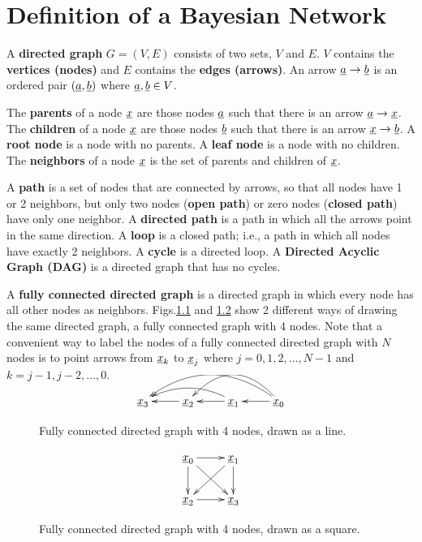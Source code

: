 \chapter{Definition of a Bayesian Network}

\label{ch-bnet-def}

A {\bf directed graph} $G=(V,E)$
consists of two sets, $V$
and $E$. $V$ contains
the {\bf vertices (nodes)}
and $E$ contains the {\bf edges (arrows)}.
An arrow $\rva\rarrow \rvb$ is an
ordered pair
$(\rva,\rvb)$ where $\rva, \rvb\in V$.

The {\bf parents}
of a node $\rvx$ are
those nodes $\rva$
such that there is an arrow
$\rva\rarrow \rvx$.
The {\bf children} of a node
$\rvx$
are those nodes $\rvb$
such that there is an arrow $\rvx\rarrow \rvb$.
A {\bf root node}
is a node with no parents.
A {\bf leaf node}
is a node with no children.
The {\bf neighbors}
of a node $\rvx$
is the set of parents and
children of $\rvx$.

A {\bf path} is a
set of nodes that
are connected
by arrows, so
that all nodes
have 1 or 2 neighbors,
but only two nodes ({\bf open path})
or zero nodes ({\bf closed path})
have only one neighbor.
A {\bf directed path}
is a path in
which all the arrows point
in the same direction.
A {\bf loop}
is a closed path; i.e.,
a path in which all
nodes have exactly 2 neighbors.
A {\bf cycle} is a directed loop.
A {\bf Directed Acyclic Graph (DAG)}
is a directed graph that has no
cycles.


A {\bf fully connected directed graph}
is
a directed graph
in which
every node has all other
nodes as neighbors.
Figs.\ref{fig-full-conn-4-line}
and
\ref{fig-full-conn-4-square}
show 2 different
ways of drawing
the same directed graph,
a fully connected graph with 4 nodes.
Note that a convenient
way
to label
the nodes of a fully
connected directed
graph
with $N$ nodes
is to point
arrows
from
$\rvx_k$ to $\rvx_j$
where $j=0, 1, 2,\ldots, N-1$
and
$k=j-1, j-2, \ldots, 0$.


\begin{figure}[h!]
$$
\xymatrix{
\rvx_3
&\rvx_2\ar[l]
&\rvx_1\ar[l]\ar@/_1pc/[ll]
&\rvx_0\ar[l]\ar@/_2pc/[ll]\ar@/_2pc/[lll]
}
$$
\caption{Fully
connected directed  graph with 4 nodes,
drawn as a line.}
\label{fig-full-conn-4-line}
\end{figure}

\begin{figure}[h!]
$$
\xymatrix{
\rvx_0\ar[r]\ar[d]\ar[rd]&\rvx_1\ar[d]\ar[ld]
\\
\rvx_2\ar[r]&\rvx_3
}
$$
\caption{Fully
connected directed  graph with 4 nodes,
drawn as a square.}
\label{fig-full-conn-4-square}
\end{figure}


